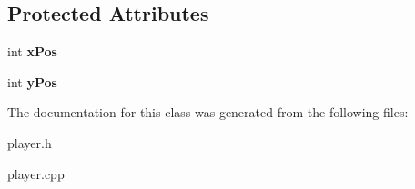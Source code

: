 \subsection*{Protected Attributes}
\begin{DoxyCompactItemize}
\item 
\hypertarget{class_player_aa3c4b095965da25dba3e777122082773}{}int {\bfseries x\+Pos}\label{class_player_aa3c4b095965da25dba3e777122082773}

\item 
\hypertarget{class_player_a0a14d018fcc4b1ad121dce82524d3c96}{}int {\bfseries y\+Pos}\label{class_player_a0a14d018fcc4b1ad121dce82524d3c96}

\end{DoxyCompactItemize}


The documentation for this class was generated from the following files\+:\begin{DoxyCompactItemize}
\item 
player.\+h\item 
player.\+cpp\end{DoxyCompactItemize}

